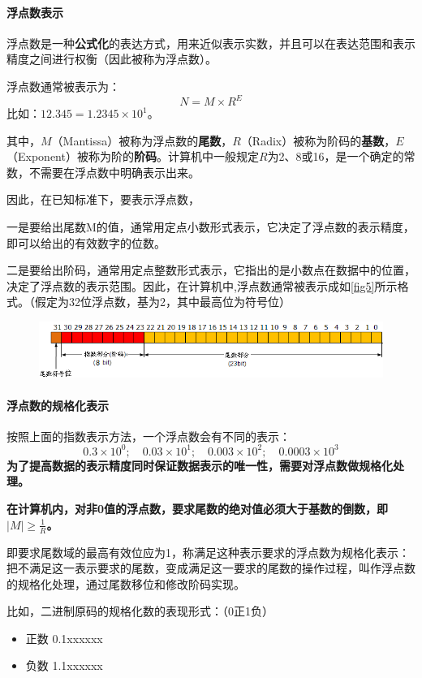 \paragraph*{浮点数表示}
浮点数是一种\textbf{公式化}的表达方式，用来近似表示实数，并且可以在表达范围和表示精度之间进行权衡（因此被称为浮点数）。

浮点数通常被表示为：
$$N=M\times R^E$$
比如：$12.345=1.2345\times 10^1$。

其中，$M$（Mantissa）被称为浮点数的\textbf{尾数}，$R$（Radix）被称为阶码的\textbf{基数}，$E$（Exponent）被称为阶的\textbf{阶码}。计算机中一般规定$R$为2、8或16，是一个确定的常数，不需要在浮点数中明确表示出来。

因此，在已知标准下，要表示浮点数，

一是要给出尾数M的值，通常用定点小数形式表示，它决定了浮点数的表示精度，即可以给出的有效数字的位数。

二是要给出阶码，通常用定点整数形式表示，它指出的是小数点在数据中的位置，决定了浮点数的表示范围。因此，在计算机中,浮点数通常被表示成如\autoref{fig5}所示格式。（假定为32位浮点数，基为2，其中最高位为符号位）

\begin{figure}[!ht]
\centering
\includegraphics[width=\textwidth]{images/358.png}
\caption{}\label{fig5}
\end{figure}

\paragraph*{浮点数的规格化表示}
按照上面的指数表示方法，一个浮点数会有不同的表示：
$$0.3\times 10^0;\quad 0.03\times 10^1;\quad 0.003\times10^2;\quad 0.0003\times 10^3$$
\textbf{为了提高数据的表示精度同时保证数据表示的唯一性，需要对浮点数做规格化处理。}

\textbf{在计算机内，对非0值的浮点数，要求尾数的绝对值必须大于基数的倒数，即$|M|\ge\frac{1}{R}$。}

即要求尾数域的最高有效位应为1，称满足这种表示要求的浮点数为规格化表示：把不满足这一表示要求的尾数，变成满足这一要求的尾数的操作过程，叫作浮点数的规格化处理，通过尾数移位和修改阶码实现。

比如，二进制原码的规格化数的表现形式：（0正1负）
\begin{itemize}
\item 正数 0.1xxxxxx
\item 负数 1.1xxxxxx
\end{itemize}

